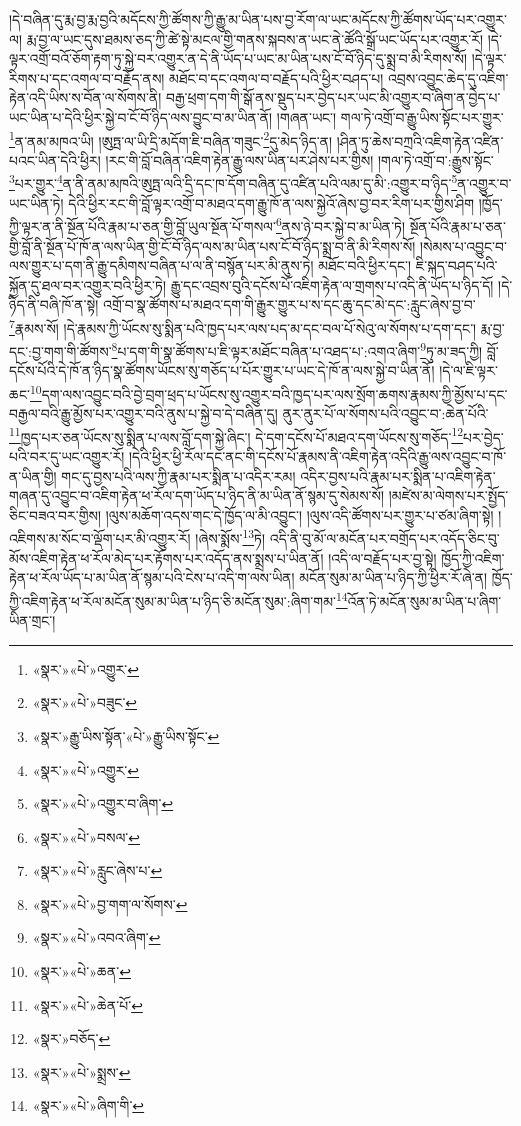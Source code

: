 །དེ་བཞིན་དུ་རྨ་བྱ་རྨ་བྱའི་མདོངས་ཀྱི་ཚོགས་ཀྱི་རྒྱུ་མ་ཡིན་པས་བྱ་རོག་ལ་ཡང་མདོངས་ཀྱི་ཚོགས་ཡོད་པར་འགྱུར་ལ། རྨ་བྱ་ལ་ཡང་དུས་ཐམས་ཅད་ཀྱི་ཚེ་སྟེ་མངལ་གྱི་གནས་སྐབས་ན་ཡང་ནེ་ཚོའི་སྒྲོ་ཡང་ཡོད་པར་འགྱུར་རོ། །དེ་ལྟར་འགྲོ་བའོ་ཅོག་རྟག་ཏུ་སྐྱེ་བར་འགྱུར་ན་དེ་ནི་ཡོད་པ་ཡང་མ་ཡིན་པས་ངོ་བོ་ཉིད་དུ་སྨྲ་བ་མི་རིགས་སོ། །དེ་ལྟར་རིགས་པ་དང་འགལ་བ་བརྗོད་ནས། མཐོང་བ་དང་འགལ་བ་བརྗོད་པའི་ཕྱིར་བཤད་པ། འབྲས་འབྱུང་ཆེད་དུ་འཇིག་རྟེན་འདི་ཡིས་ས་བོན་ལ་སོགས་ནི། བརྒྱ་ཕྲག་དག་གི་སྒོ་ནས་སྡུད་པར་བྱེད་པར་ཡང་མི་འགྱུར་བ་ཞིག་ན་བྱེད་པ་ཡང་ཡིན་པ་དེའི་ཕྱིར་སྐྱེ་བ་ངོ་བོ་ཉིད་ལས་བྱུང་བ་མ་ཡིན་ནོ། །གཞན་ཡང་། གལ་ཏེ་འགྲོ་བ་རྒྱུ་ཡིས་སྟོང་པར་གྱུར་\footnote{«སྣར་»«པེ་»འགྱུར་}ན་ནམ་མཁའ་ཡི། །ཨུཏྤ་ལ་ཡི་དྲི་མདོག་ཇི་བཞིན་གཟུང་\footnote{«སྣར་»«པེ་»བཟུང་}དུ་མེད་ཉིད་ན། །ཤིན་ཏུ་ཆེས་བཀྲའི་འཇིག་རྟེན་འཛིན་པའང་ཡིན་དེའི་ཕྱིར། །རང་གི་བློ་བཞིན་འཇིག་རྟེན་རྒྱུ་ལས་ཡིན་པར་ཤེས་པར་གྱིས། །གལ་ཏེ་འགྲོ་བ་:རྒྱུས་སྟོང་\footnote{«སྣར་»རྒྱུ་ཡིས་སྟོན་«པེ་»རྒྱུ་ཡིས་སྟོང་}པར་གྱུར་\footnote{«སྣར་»«པེ་»འགྱུར་}ན་ནི་ནམ་མཁའི་ཨུཏྤ་ལའི་དྲི་དང་ཁ་དོག་བཞིན་དུ་འཛིན་པའི་ལམ་དུ་མི་:འགྱུར་བ་ཉིད་\footnote{«སྣར་»«པེ་»འགྱུར་བ་ཞིག་}ན་འགྱུར་བ་ཡང་ཡིན་ཏེ། དེའི་ཕྱིར་རང་གི་བློ་ལྟར་འགྲོ་བ་མཐའ་དག་རྒྱུ་ཁོ་ན་ལས་སྐྱེའོ་ཞེས་བྱ་བར་རིག་པར་གྱིས་ཤིག །ཁྱོད་ཀྱི་ལྟར་ན་ནི་སྔོན་པོའི་རྣམ་པ་ཅན་གྱི་བློ་ཡུལ་སྔོན་པོ་གསལ་\footnote{«སྣར་»«པེ་»བསལ་}ནས་ཉེ་བར་སྐྱེ་བ་མ་ཡིན་ཏེ། སྔོན་པོའི་རྣམ་པ་ཅན་གྱི་བློ་ནི་སྔོན་པོ་ཁོ་ན་ལས་ཡིན་གྱི་ངོ་བོ་ཉིད་ལས་མ་ཡིན་པས་ངོ་བོ་ཉིད་སྨྲ་བ་ནི་མི་རིགས་སོ། །སེམས་པ་འབྱུང་བ་ལས་གྱུར་པ་དག་ནི་རྒྱུ་དམིགས་བཞིན་པ་ལ་ནི་བསྙོན་པར་མི་ནུས་ཏེ། མཐོང་བའི་ཕྱིར་དང་། ཇི་སྐད་བཤད་པའི་སྐྱོན་དུ་ཐལ་བར་འགྱུར་བའི་ཕྱིར་ཏེ། རྒྱུ་དང་འབྲས་བུའི་དངོས་པོ་འཇིག་རྟེན་ལ་གྲགས་པ་འདི་ནི་ཡོད་པ་ཉིད་དོ། །དེ་ཉིད་ནི་བཞི་ཁོ་ན་སྟེ། འགྲོ་བ་སྣ་ཚོགས་པ་མཐའ་དག་གི་རྒྱུར་གྱུར་པ་ས་དང་ཆུ་དང་མེ་དང་:རླུང་ཞེས་བྱ་བ་\footnote{«སྣར་»«པེ་»རླུང་ཞེས་པ་}རྣམས་སོ། །དེ་རྣམས་ཀྱི་ཡོངས་སུ་སྨིན་པའི་ཁྱད་པར་ལས་པད་མ་དང་བལ་པོ་སེའུ་ལ་སོགས་པ་དག་དང་། རྨ་བྱ་དང་:བྱ་གག་གི་ཚོགས་\footnote{«སྣར་»«པེ་»བྱ་གག་ལ་སོགས་}པ་དག་གི་སྣ་ཚོགས་པ་ཇི་ལྟར་མཐོང་བཞིན་པ་འཐད་པ་:འགའ་ཞིག་\footnote{«སྣར་»«པེ་»འབའ་ཞིག་}ཏུ་མ་ཟད་ཀྱི། བློ་དངོས་པོའི་དེ་ཁོ་ན་ཉིད་སྣ་ཚོགས་ཡོངས་སུ་གཅོད་པ་པོར་གྱུར་པ་ཡང་དེ་ཁོ་ན་ལས་སྐྱེ་བ་ཡིན་ནོ། །དེ་ལ་ཇི་ལྟར་ཆང་\footnote{«སྣར་»«པེ་»ཆན་}དག་ལས་འབྱུང་བའི་བྱེ་བྲག་ཕྲད་པ་ཡོངས་སུ་འགྱུར་བའི་ཁྱད་པར་ལས་སྲོག་ཆགས་རྣམས་ཀྱི་མྱོས་པ་དང་བརྒྱལ་བའི་རྒྱུ་མྱོས་པར་འགྱུར་བའི་ནུས་པ་སྐྱེ་བ་དེ་བཞིན་དུ། ནུར་ནུར་པོ་ལ་སོགས་པའི་འབྱུང་བ་:ཆེན་པོའི་\footnote{«སྣར་»«པེ་»ཆེན་པོ་}ཁྱད་པར་ཅན་ཡོངས་སུ་སྨིན་པ་ལས་བློ་དག་སྐྱེ་ཞིང་། དེ་དག་དངོས་པོ་མཐའ་དག་ཡོངས་སུ་གཅོད་\footnote{«སྣར་»བཅོད་}པར་བྱེད་པའི་བར་དུ་ཡང་འགྱུར་རོ། །དེའི་ཕྱིར་ཕྱི་རོལ་དང་ནང་གི་དངོས་པོ་རྣམས་ནི་འཇིག་རྟེན་འདིའི་རྒྱུ་ལས་འབྱུང་བ་ཁོ་ན་ཡིན་གྱི། གང་དུ་བྱས་པའི་ལས་ཀྱི་རྣམ་པར་སྨིན་པ་འདིར་རམ། འདིར་བྱས་པའི་རྣམ་པར་སྨིན་པ་འཇིག་རྟེན་གཞན་དུ་འབྱུང་བ་འཇིག་རྟེན་ཕ་རོལ་དག་ཡོད་པ་ཉིད་ནི་མ་ཡིན་ནོ་སྙམ་དུ་སེམས་སོ། །མཛེས་མ་ལེགས་པར་སྤྱོད་ཅིང་བཟའ་བར་གྱིས། །ལུས་མཆོག་འདས་གང་དེ་ཁྱོད་ལ་མི་འབྱུང་། །ལུས་འདི་ཚོགས་པར་གྱུར་པ་ཙམ་ཞིག་སྟེ། །འཇིགས་མ་སོང་བ་ལྡོག་པར་མི་འགྱུར་རོ། །ཞེས་སྨོས་\footnote{«སྣར་»«པེ་»སྨྲས་}ཏེ། འདི་ནི་བུ་མོ་ལ་མངོན་པར་བགྲོད་པར་འདོད་ཅིང་བུ་མོས་འཇིག་རྟེན་ཕ་རོལ་མེད་པར་རྟོགས་པར་འདོད་ནས་སྨྲས་པ་ཡིན་ནོ། །འདི་ལ་བརྗོད་པར་བྱ་སྟེ། ཁྱོད་ཀྱི་འཇིག་རྟེན་ཕ་རོལ་ཡོད་པ་མ་ཡིན་ནོ་སྙམ་པའི་ངེས་པ་འདི་ག་ལས་ཡིན། མངོན་སུམ་མ་ཡིན་པ་ཉིད་ཀྱི་ཕྱིར་རོ་ཞེ་ན། ཁྱོད་ཀྱི་འཇིག་རྟེན་ཕ་རོལ་མངོན་སུམ་མ་ཡིན་པ་ཉིད་ཅི་མངོན་སུམ་:ཞིག་གམ་\footnote{«སྣར་»«པེ་»ཞིག་གི་}འོན་ཏེ་མངོན་སུམ་མ་ཡིན་པ་ཞིག་ཡིན་གྲང་། 